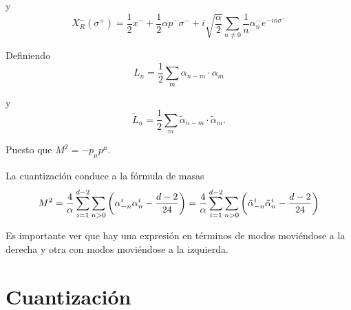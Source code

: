 y
\begin{equation}
  X^-_R(\sigma^+)=\frac 1 2 x^- + \frac 1 2 \alpha p^- \sigma^- + i\sqrt{\frac \alpha 2}
  \sum_{n\neq0} \frac 1 n \alpha^-_n e^{-in\sigma^-}
\end{equation}

Definiendo
\begin{equation}
  L_n=\frac 1 2 \sum_m \alpha_{n-m} \cdot \alpha_m
\end{equation}

y
\begin{equation}
  \tilde{L}_n=\frac 1 2 \sum_m \tilde{\alpha}_{n-m} \cdot \tilde{\alpha}_m.
\end{equation}

Puesto que $M^2=-p_\mu p^\mu$.

La cuantización conduce a la fórmula de masas 
\begin{equation}
  M^2=\frac{4}{\alpha}\sum_{i=1}^{d-2}\sum_{n>0}\qty(\alpha^i_{-n}\alpha^i_n - \frac{d-2}{24})=
  \frac{4}{\alpha}\sum_{i=1}^{d-2}\sum_{n>0}\qty(\tilde{\alpha}^i_{-n}\tilde{\alpha}^i_n -\frac{d-2}{24})
\end{equation}

Es importante ver que hay una expresión en términos de modos moviéndose a la derecha
y otra con modos moviéndose a la izquierda.

\section{Cuantización}


